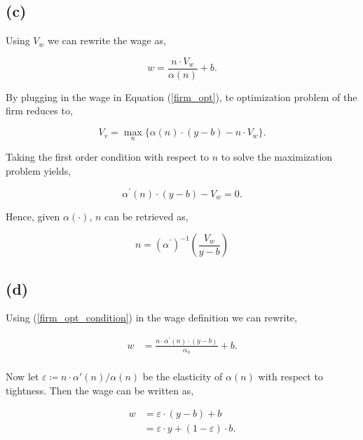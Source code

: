 \documentclass[american]{scrartcl}
\begin{document}
\subsection*{(c)}

Using $V_w$ we can rewrite the wage as,

\begin{equation}
    w = \frac{n \cdot V_w}{\alpha(n)} + b.
\end{equation}

By plugging in the wage in Equation (\ref{firm_opt}), te optimization problem of the firm reduces to,

\begin{equation}
    V_v = \max_{n} \{ \alpha(n) \cdot (y - b) - n \cdot V_w \}.
\end{equation}

Taking the first order condition with respect to $n$ to solve the maximization problem yields,

\begin{equation} \label{firm_opt_condition}
    \alpha^\prime(n) \cdot(y-b) - V_w = 0.
\end{equation}

Hence, given $\alpha(\cdot)$, $n$ can be retrieved as,

\begin{equation}
    n = (\alpha^\prime)^{-1}\left( \frac{V_w}{y - b} \right)
\end{equation}


\subsection*{(d)}

Using (\ref{firm_opt_condition}) in the wage definition we can rewrite,

\begin{equation} \label{eq_wages}
    \begin{split}
        w &= \frac{n \cdot \alpha^\prime(n) \cdot(y-b)}{\alpha_n} + b. \\
    \end{split}
\end{equation}

Now let $\varepsilon \coloneqq n \cdot \alpha\prime(n) / \alpha(n)$ be the elasticity of $\alpha(n)$ with respect to tightness. Then the wage can be written as,

\begin{equation} \label{eq_wages_el}
    \begin{split}
        w &= \varepsilon \cdot (y - b) + b \\
        &= \varepsilon \cdot y + (1 - \varepsilon) \cdot b.
    \end{split}
\end{equation}
\end{document}
